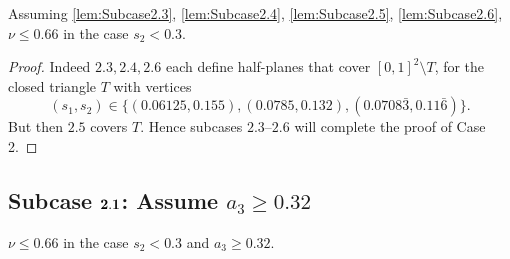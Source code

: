 \begin{lemma}\label{lem:Case2}
  \leanok
  Assuming \ref{lem:Subcase2.3}, \ref{lem:Subcase2.4}, \ref{lem:Subcase2.5}, \ref{lem:Subcase2.6},
  $\nu \leq 0.66$ in the case $s_2 < 0.3$.
\end{lemma}
\begin{proof}
  \leanok
  Indeed $\mathbf{2.3}, \mathbf{2.4}, \mathbf{2.6}$
  each define half-planes that cover $[0,1]^2\setminus T$, for the closed triangle $T$ with vertices
  \[
  (s_1,s_2)\in \{(0.06125,0.155), (0.0785,0.132), (
  0.0708\bar3,
  0.11\bar 6)\}.
  \]
  But then
  $\mathbf{2.5}$ covers $T$. Hence subcases $\mathbf{2.3}$--$\mathbf{2.6}$ will complete the proof of Case 2.
\end{proof}

\subsection*{Subcase $\bf{2.1}$: Assume $a_3\geq 0.32$}

\begin{lemma}\label{lem:Subcase2.1}
  \leanok
  $\nu \leq 0.66$ in the case $s_2<0.3$ and $a_3\geq 0.32$.
\end{lemma}

